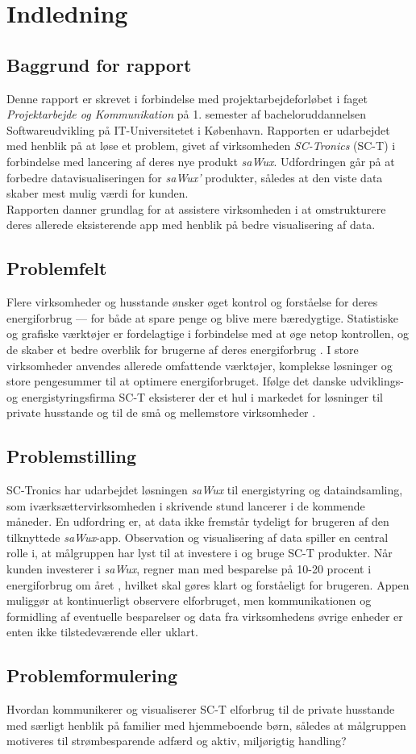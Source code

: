 \chapter{Indledning}
\section{Baggrund for rapport}
Denne rapport er skrevet i forbindelse med projektarbejdeforløbet i faget \emph{Projektarbejde og Kommunikation} på 1. semester af bacheloruddannelsen Softwareudvikling på IT-Universitetet i København. Rapporten er udarbejdet med henblik på at løse et problem, givet af virksomheden \emph{SC-Tronics} (SC-T) i forbindelse med lancering af deres nye produkt \emph{saWux}. Udfordringen går på at forbedre datavisualiseringen for \emph{saWux'} produkter, således at den viste data skaber mest mulig værdi for kunden.\\
Rapporten danner grundlag for at assistere virksomheden i at omstrukturere deres allerede eksisterende app med henblik på bedre visualisering af data.

\section{Problemfelt}
Flere virksomheder og husstande ønsker øget kontrol og forståelse for deres energiforbrug \citep{klimaindsats} — for både at spare penge og blive mere bæredygtige. Statistiske og grafiske værktøjer er fordelagtige i forbindelse med at øge netop kontrollen, og de skaber et bedre overblik for brugerne af deres energiforbrug \citep{herrmann}. I store virksomheder anvendes allerede omfattende værktøjer, komplekse løsninger og store pengesummer til at optimere energiforbruget. Ifølge det danske udviklings- og energistyringsfirma SC-T eksisterer der et hul i markedet for løsninger til private husstande og til de små og mellemstore virksomheder \citep{sawux}.

\section{Problemstilling}
SC-Tronics har udarbejdet løsningen \emph{saWux} til energistyring og dataindsamling, som iværksættervirksomheden i skrivende stund lancerer i de kommende måneder. En udfordring er, at data ikke fremstår tydeligt for brugeren af den tilknyttede \emph{saWux}-app. Observation og visualisering af data spiller en central rolle i, at målgruppen har lyst til at investere i og bruge SC-T produkter. Når kunden investerer i \emph{saWux}, regner man med besparelse på 10-20 procent i energiforbrug om året \citep{sawux}, hvilket skal gøres klart og forståeligt for brugeren. Appen muliggør at kontinuerligt observere elforbruget, men kommunikationen og formidling af eventuelle besparelser og data fra virksomhedens øvrige enheder er enten ikke tilstedeværende eller uklart.

\section{Problemformulering}
Hvordan kommunikerer og visualiserer SC-T elforbrug til de private husstande med særligt henblik på familier med hjemmeboende børn, således at målgruppen motiveres til strømbesparende adfærd og aktiv, miljørigtig handling?